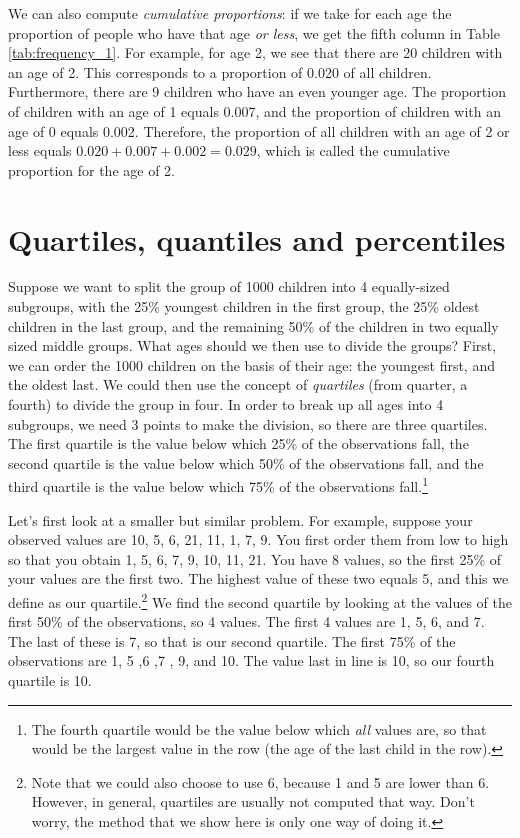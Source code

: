 We can also compute \textit{cumulative proportions}: if we take for each age the proportion of people who have that age \textit{or less}, we get the fifth column in Table \ref{tab:frequency_1}. For example, for age 2, we see that there are 20 children with an age of 2. This corresponds to a proportion of 0.020 of all children. Furthermore, there are 9 children who have an even younger age. The proportion of children with an age of 1 equals 0.007, and the proportion of children with an age of 0 equals 0.002. Therefore, the proportion of all children with an age of 2 or less equals $0.020+0.007+0.002=0.029$, which is called the cumulative proportion for the age of 2.



\section{Quartiles, quantiles and percentiles}

Suppose we want to split the group of 1000 children into 4 equally-sized subgroups, with the 25\% youngest children in the first group, the 25\% oldest children in the last group, and the remaining 50\% of the children in two equally sized middle groups. What ages should we then use to divide the groups? First, we can order the 1000 children on the basis of their age: the youngest first, and the oldest last. We could then use the concept of \textit{quartiles} (from quarter, a fourth) to divide the group in four. In order to break up all ages into 4 subgroups, we need 3 points to make the division, so there are three quartiles. The first quartile is the value below which 25\% of the observations fall, the second quartile is the value below which 50\% of the observations fall, and the third quartile is the value below which 75\% of the observations fall.\footnote{The fourth quartile would be the value below which \textit{all} values are, so that would be the largest value in the row (the age of the last child in the row).}

Let's first look at a smaller but similar problem. For example, suppose your observed values are {10, 5, 6, 21, 11, 1, 7, 9}. You first order them from low to high so that you obtain {1, 5, 6, 7, 9, 10, 11, 21}. You have 8 values, so the first 25\% of your values are the first two. The highest value of these two equals 5, and this we define as our quartile.\footnote{Note that we could also choose to use 6,
because 1 and 5 are lower than 6. However, in general, quartiles are usually not computed that way. Don't worry, the method that we show here is only one way of doing it.} We find the second quartile by looking at the values of the first 50\% of the observations, so 4 values. The first 4 values are 1, 5, 6, and 7. The last of these is 7, so that is our second quartile. The first 75\% of the observations are 1, 5 ,6 ,7 , 9, and 10. The value last in line is 10, so our fourth quartile is 10.

